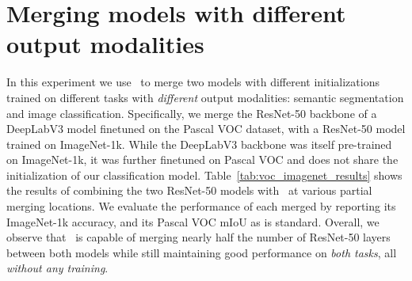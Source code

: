 \section{Merging models with different output modalities} \label{appendix:semantic_segmentation}

In this experiment we use \name{}\ to merge two models with different initializations trained on different tasks with \textit{different} output modalities: semantic segmentation and image classification. 
Specifically, we merge the ResNet-50 backbone of a DeepLabV3 \citep{chen2017deeplabv3} model finetuned on the Pascal VOC \citep{Everingham10pascalvoc} dataset, with a ResNet-50 model trained on ImageNet-1k.
While the DeepLabV3 backbone was itself pre-trained on ImageNet-1k, it was further finetuned on Pascal VOC and does not share the initialization of our classification model. Table~\ref{tab:voc_imagenet_results} shows the results of combining the two ResNet-50 models with \name{}\ at various partial merging locations. 
We evaluate the performance of each merged by reporting its ImageNet-1k accuracy, and its Pascal VOC mIoU as is standard. 
Overall, we observe that \name{}\ is capable of merging nearly half the number of ResNet-50 layers between both models while still maintaining good performance on \textit{both tasks}, all \textit{without any training}.





